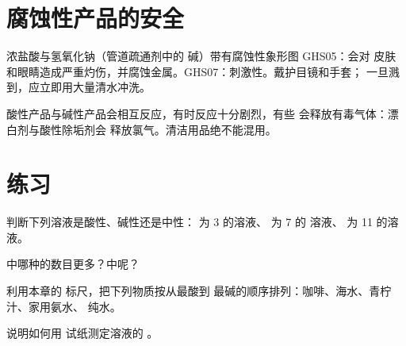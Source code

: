 \section{腐蚀性产品的安全}

\begin{safety}{}
浓盐酸与氢氧化钠（管道疏通剂中的
碱）带有腐蚀性象形图 GHS05：会对
皮肤和眼睛造成严重灼伤，并腐蚀金属。GHS07：刺激性。戴护目镜和手套；
一旦溅到，应立即用大量清水冲洗。
\end{safety}

\begin{remark}[切勿混用清洁用品]\label{rem:g9:acids-bases-ph:mix}
酸性产品与碱性产品会相互反应，有时反应十分剧烈，有些
会释放有毒气体：漂白剂与酸性除垢剂会
释放氯气。清洁用品绝不能混用。
\end{remark}

\section{练习}

\begin{exercise}[$\star$]\label{exo:g9:acids-bases-ph:1}
判断下列溶液是酸性、碱性还是中性： 为 3 的溶液、 为 7 的
溶液、 为 11 的溶液。
\end{exercise}

\begin{exercise}[$\star$]\label{exo:g9:acids-bases-ph:2}
中哪种的数目更多？中呢？
\end{exercise}

\begin{exercise}[$\star$]\label{exo:g9:acids-bases-ph:3}
利用本章的  标尺，把下列物质按从最酸到
最碱的顺序排列：咖啡、海水、青柠汁、家用氨水、
纯水。
\end{exercise}

\begin{exercise}[$\star$]\label{exo:g9:acids-bases-ph:4}
说明如何用  试纸测定溶液的 。
\end{exercise}


